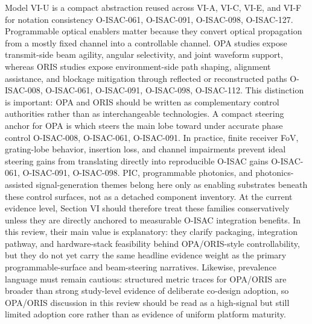 {}\markdownRendererBlockQuoteBegin
{}\markdownRendererParagraphSeparator
{}\markdownRendererSoftLineBreak
{}\markdownRendererSoftLineBreak
{}\markdownRendererParagraphSeparator
{}Model VI-U is a compact abstraction reused across VI-A, VI-C, VI-E, and VI-F for notation consistency O-ISAC-061, O-ISAC-091, O-ISAC-098, O-ISAC-127.\markdownRendererBlockQuoteEnd \markdownRendererInterblockSeparator
{}\markdownRendererSectionBegin
{}\markdownRendererInterblockSeparator
{}Programmable optical enablers matter because they convert optical propagation from a mostly fixed channel into a controllable channel. OPA studies expose transmit-side beam agility, angular selectivity, and joint waveform support, whereas ORIS studies expose environment-side path shaping, alignment assistance, and blockage mitigation through reflected or reconstructed paths O-ISAC-008, O-ISAC-061, O-ISAC-091, O-ISAC-098, O-ISAC-112. This distinction is important: OPA and ORIS should be written as complementary control authorities rather than as interchangeable technologies.\markdownRendererParagraphSeparator
{}A compact steering anchor for OPA is\markdownRendererParagraphSeparator
{}\markdownRendererSoftLineBreak
{}\markdownRendererParagraphSeparator
{}which steers the main lobe toward  under accurate phase control O-ISAC-008, O-ISAC-061, O-ISAC-091. In practice, finite receiver FoV, grating-lobe behavior, insertion loss, and channel impairments prevent ideal steering gains from translating directly into reproducible O-ISAC gains O-ISAC-061, O-ISAC-091, O-ISAC-098.\markdownRendererParagraphSeparator
{}PIC, programmable photonics, and photonics-assisted signal-generation themes belong here only as enabling substrates beneath these control surfaces, not as a detached component inventory. At the current evidence level, Section VI should therefore treat these families conservatively unless they are directly anchored to measurable O-ISAC integration benefits. In this review, their main value is explanatory: they clarify packaging, integration pathway, and hardware-stack feasibility behind OPA/ORIS-style controllability, but they do not yet carry the same headline evidence weight as the primary programmable-surface and beam-steering narratives. Likewise, prevalence language must remain cautious: structured metric traces for OPA/ORIS are broader than strong study-level evidence of deliberate co-design adoption, so OPA/ORIS discussion in this review should be read as a high-signal but still limited adoption core rather than as evidence of uniform platform maturity.\markdownRendererParagraphSeparator
